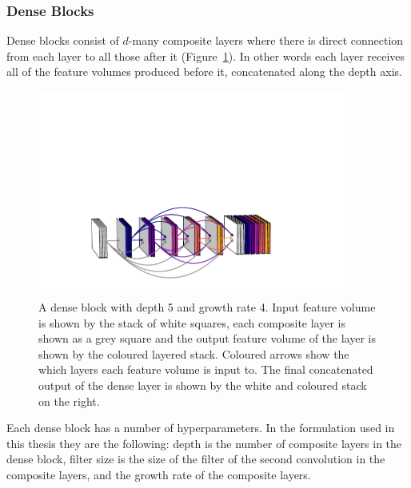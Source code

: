 \subsubsection{Dense Blocks}
Dense blocks consist of $d$-many composite layers where there is direct connection from each layer to all those after it (Figure~\ref{fig:machine_learning:dense_block}). 
In other words each layer receives all of the feature volumes produced before it, concatenated along the depth axis. 
\begin{figure}[h!]
    \centering
    \includegraphics[width=0.90\textwidth]{figures/machine_learning/dense_block.pdf}
    \caption{A dense block with depth 5 and growth rate 4. Input feature volume is shown by the stack of white squares, each composite layer is shown as a grey square and the output feature volume of the layer is shown by the coloured layered stack. Coloured arrows show the which layers each feature volume is input to. The final concatenated output of the dense layer is shown by the white and coloured stack on the right.}
        \label{fig:machine_learning:dense_block}
\end{figure}
Each dense block has a number of hyperparameters. In the formulation used in this thesis they are the following: depth is the number of composite layers in the dense block, filter size is the size of the filter of the second convolution in the composite layers, and the growth rate of the composite layers.


